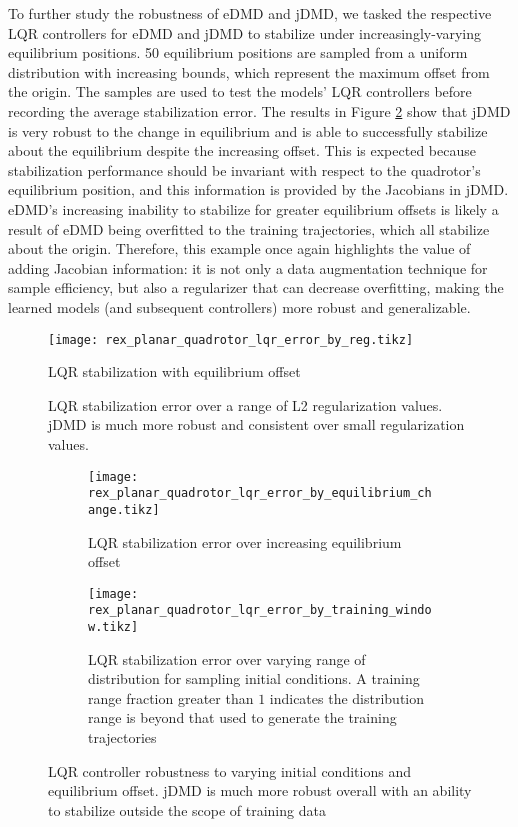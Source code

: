 \documentclass{article}
\begin{document}
To further study the robustness of eDMD and jDMD, we tasked the respective LQR controllers for eDMD and jDMD to stabilize under increasingly-varying equilibrium positions. 50 equilibrium positions are sampled from a uniform distribution with increasing bounds, which represent the maximum offset from the origin. The samples are used to test the models' LQR controllers before recording the average stabilization error. The results in Figure \ref{fig:rex_planar_quadrotor_lqr_error_by_equilibrium_change} show that jDMD is very robust to the change in equilibrium and is able to successfully stabilize about the equilibrium despite the increasing offset. This is expected because stabilization performance should be invariant with respect to the quadrotor's equilibrium position, and this information is provided by the Jacobians in jDMD. eDMD's increasing inability to stabilize for greater equilibrium offsets is likely a result of eDMD being overfitted to the training trajectories, which all stabilize about the origin. Therefore, this example once again highlights the value of adding Jacobian information: it is not only a data augmentation technique for sample efficiency, but also a regularizer that can decrease overfitting, making the learned models (and subsequent controllers) more robust and generalizable.

\begin{figure}
    \centering
    \texttt{[image: rex\_planar\_quadrotor\_lqr\_error\_by\_reg.tikz]}
    \caption{LQR stabilization with equilibrium offset}
    \label{fig:rex_planar_quadrotor_lqr_error_by_reg}
    \caption{ LQR stabilization error over a range of L2 regularization values. jDMD is much more robust and consistent over small regularization values.}
\end{figure}

\begin{figure}
    \centering
    \begin{subfigure}[t]{0.45\textwidth}
        \texttt{[image: rex\_planar\_quadrotor\_lqr\_error\_by\_equilibrium\_change.tikz]}
        \caption{LQR stabilization error over increasing equilibrium offset}
        \label{fig:rex_planar_quadrotor_lqr_error_by_equilibrium_change}
    \end{subfigure}
    \begin{subfigure}[t]{0.45\textwidth}
        \texttt{[image: rex\_planar\_quadrotor\_lqr\_error\_by\_training\_window.tikz]}
        \caption{LQR stabilization error over varying range of distribution for sampling initial conditions. A training range fraction greater than $1$ indicates the distribution range is beyond that used to generate the training trajectories}
        \label{fig:rex_planar_quadrotor_lqr_error_by_training_window}
    \end{subfigure}
    \caption{ LQR controller robustness to varying initial conditions and equilibrium offset. jDMD is much more robust overall with an ability to stabilize outside the scope of training data }
\end{figure}
\end{document}
